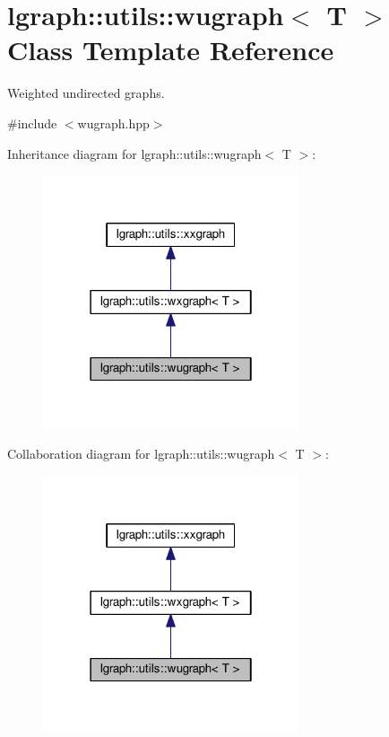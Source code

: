 \hypertarget{classlgraph_1_1utils_1_1wugraph}{}\section{lgraph\+:\+:utils\+:\+:wugraph$<$ T $>$ Class Template Reference}
\label{classlgraph_1_1utils_1_1wugraph}


Weighted undirected graphs.  




{\ttfamily \#include $<$wugraph.\+hpp$>$}



Inheritance diagram for lgraph\+:\+:utils\+:\+:wugraph$<$ T $>$\+:\nopagebreak
\begin{figure}[H]
\begin{center}
\leavevmode
\includegraphics[width=214pt]{classlgraph_1_1utils_1_1wugraph__inherit__graph}
\end{center}
\end{figure}


Collaboration diagram for lgraph\+:\+:utils\+:\+:wugraph$<$ T $>$\+:\nopagebreak
\begin{figure}[H]
\begin{center}
\leavevmode
\includegraphics[width=214pt]{classlgraph_1_1utils_1_1wugraph__coll__graph}
\end{center}
\end{figure}
